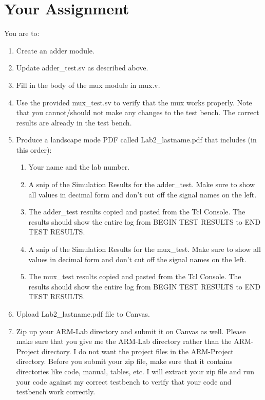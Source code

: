 \section{Your Assignment}

You are to:
\begin{enumerate}
\item Create an adder module.
\item Update adder\_test.sv as described above.	
\item Fill in the body of the mux module in mux.v.
\item Use the provided mux\_test.sv to verify that the mux works properly.  Note that you cannot/should not make any changes to the test bench.  The correct results are already in the test bench.	
\item Produce a landscape mode PDF called Lab2\_lastname.pdf that includes (in this order):
\begin{enumerate}
	\item Your name and the lab number.
	\item A snip of the Simulation Results for the adder\_test.  Make sure to show all values in decimal form and don't cut off the signal names on the left.  
	\item The adder\_test results copied and pasted from the Tcl Console.  The results should show the entire log from BEGIN TEST RESULTS to END TEST RESULTS.
	\item A snip of the Simulation Results for the mux\_test.  Make sure to show all values in decimal form and don't cut off the signal names on the left.  
	\item The mux\_test results copied and pasted from the Tcl Console.  The results should show the entire log from BEGIN TEST RESULTS to END TEST RESULTS.
\end{enumerate}
\item Upload Lab2\_lastname.pdf file to Canvas.
\item Zip up your ARM-Lab directory and submit it on Canvas as well.  Please make sure that you give me the ARM-Lab directory rather than the ARM-Project directory.  I do not want the project files in the ARM-Project directory.  Before you submit your zip file, make sure that it contains directories like code, manual, tables, etc.  I will extract your zip file and run your code against my correct testbench to verify that your code and testbench work correctly.
\end{enumerate} 
